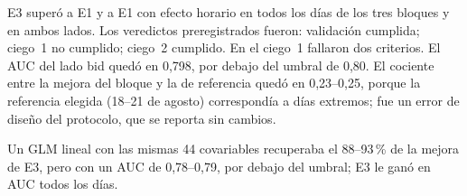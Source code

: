 E3 superó a E1 y a E1 con efecto horario en todos los días de los tres bloques y en ambos lados. Los veredictos preregistrados fueron: validación cumplida; ciego~1 no cumplido; ciego~2 cumplido. En el ciego~1 fallaron dos criterios. El AUC del lado bid quedó en 0,798, por debajo del umbral de 0,80. El cociente entre la mejora del bloque y la de referencia quedó en 0,23--0,25, porque la referencia elegida (18--21 de agosto) correspondía a días extremos; fue un error de diseño del protocolo, que se reporta sin cambios.

Un GLM lineal con las mismas 44 covariables recuperaba el 88--93\,\% de la mejora de E3, pero con un AUC de 0,78--0,79, por debajo del umbral; E3 le ganó en AUC todos los días.

